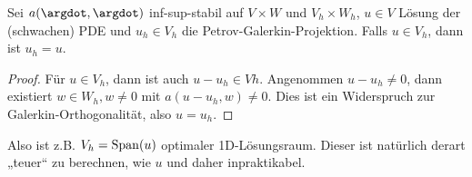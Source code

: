
\begin{kor} \label{3.49}
	Sei $a(\argdot, \argdot)$ inf-sup-stabil auf $V \times W$ und $V_h \times W_h$, $u \in V$ Lösung der (schwachen) PDE und $u_h \in V_h$ die Petrov-Galerkin-Projektion.
	Falls $u \in V_h$, dann ist $u_h = u$.
	\begin{proof}
		Für $u \in V_h$, dann ist auch $u - u_h \in Vh$.
		Angenommen $u - u_h \neq 0$, dann existiert $w \in W_h, w \neq 0$ mit
		\begin{math}
			a(u-u_h, w) \neq 0.
		\end{math}
		Dies ist ein Widerspruch zur Galerkin-Orthogonalität, also $u = u_h$.
	\end{proof}
	\begin{note}
		Also ist z.B. $V_h = \operatorname{Span}(u)$ optimaler 1D-Lösungsraum.
		Dieser ist natürlich derart „teuer“ zu berechnen, wie $u$ und daher inpraktikabel.
	\end{note}
\end{kor}

